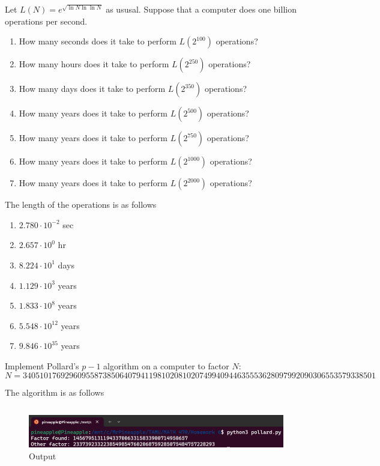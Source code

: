 \documentclass[12pt]{article}
\begin{document}
\newpage
\problem Let $L(N)=e^{\sqrt{\ln{N}\ln{\ln{N}}}}$ as ususal. Suppose that a computer does one billion operations per second.
\begin{enumerate}
    \item How many seconds does it take to perform $L(2^{100})$ operations?
    \item How many hours does it take to perform $L(2^{250})$ operations?
    \item How many days does it take to perform $L(2^{350})$ operations?
    \item How many years does it take to perform $L(2^{500})$ operations?
    \item How many years does it take to perform $L(2^{750})$ operations?
    \item How many years does it take to perform $L(2^{1000})$ operations?
    \item How many years does it take to perform $L(2^{2000})$ operations?
\end{enumerate}

\solution The length of the operations is as follows
\begin{enumerate}
    \item $2.780\cdot10^{-2}$ sec
    \item $2.657\cdot10^{0}$ hr
    \item $8.224\cdot10^{1}$ days
    \item $1.129\cdot10^{3}$ years
    \item $1.833\cdot10^{8}$ years
    \item $5.548\cdot10^{12}$ years
    \item $9.846\cdot10^{35}$ years
\end{enumerate}

\newpage
\problem Implement Pollard's $p-1$ algorithm on a computer to factor $N$:
\[N=340510176929609558738506407941198102081020749940944635553628097992090306553579338501\]

\solution
The algorithm is as follows
\inputminted{python3}{pollard.py}

\begin{figure}[!ht]
    \centering
    \includegraphics[width=\textwidth]{q4.png}
    \caption{Output}
\end{figure}
\end{document}
